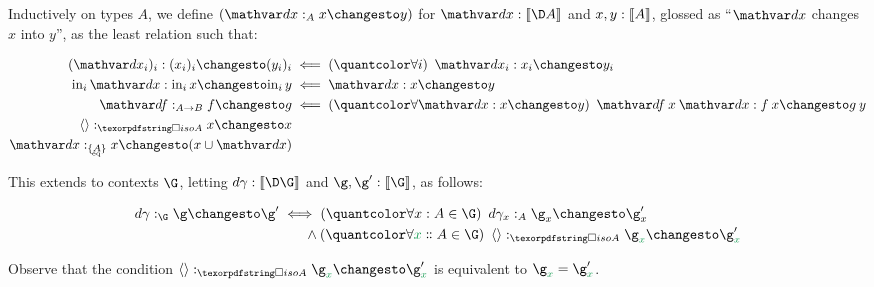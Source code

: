 
\begin{definition} \label{def:changes}
  Inductively on types $A$, we define $(\changesat{A}{\dx}{x}{y})$ for $\dx :
  \den{\D A}$ and $x,y : \llbracket{A}\rrbracket$, glossed as ``$\dx$ changes $x$ into $y$'', as
  the least relation such that:

  \begin{align*}
    \changes{(\dx_i)_i}{(x_i)_i}{(y_i)_i}
    &\impliedby \fa{i} \changes{\dx_i}{x_i}{y_i}
    \\
    \changes{\inj i \dx}{\inj i x}{\inj i y}
    &\impliedby \changes{\dx}{x}{y}
    \\
    \changesat{A \to B}{\df}{f}{g}
    &\impliedby \fa{\changes\dx x y} \changes{\df\<x\<\dx}{f\<x}{g\<y}
    \\
    \changesat{\isof A}{\tuple{}}{x}{x}\\
    \changesat{\tseteq A}{\dx}{x}{(x \cup \dx)}
  \end{align*}

  \noindent This extends to contexts $\G$, letting $\dgamma : \den{\D\G}$ and
  $\g,\g' : \den{\G}$, as follows:

  \begin{align*}
    \changesat{\G}{\dgamma}{\g}{\g'}
    &\iff \fa{\h x A \in \G} \changesat{A}{\dgamma_x}{\g_x}{\g'_x}
    \\
    &\hspace*{1.8em}\wedge
    \fa{\hd x A \in \G}
    \changesat{\isof A}{\tuple{}}{\g_{\dvar x}}{\g'_{\dvar x}}
  \end{align*}

  \noindent Observe that the condition $\changesat{\isof A}{\tuple{}}{\g_{\dvar
      x}}{\g'_{\dvar x}}$ is equivalent to $\g_{\dvar x} = \g'_{\dvar x}$.

\end{definition}

